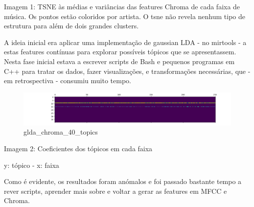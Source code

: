 \documentclass[11pt]{article}
\makeatletter
\def\maxwidth{\ifdim\Gin@nat@width>\linewidth\linewidth
    \else\Gin@nat@width\fi}
\let\Oldincludegraphics\includegraphics
\renewcommand{\includegraphics}[1]{\Oldincludegraphics[width=.8\maxwidth]{#1}}
\makeatother
\begin{document}
Imagem 1: TSNE às médias e variâncias das features Chroma de cada faixa
de música. Os pontos estão coloridos por artista. O tsne não revela
nenhum tipo de estrutura para além de dois grandes clusters.

    A ideia inicial era aplicar uma implementação de gaussian LDA - no
mirtools - a estas features contínuas para explorar possíveis tópicos
que se apresentassem. Nesta fase inicial estava a escrever scripts de
Bash e pequenos programas em C++ para tratar os dados, fazer
visualizações, e transformações necessárias, que - em retrospectiva -
consumiu muito tempo.

    \begin{figure}
\centering
\includegraphics{Resources/phase0/Chroma/gLDA/glda_chroma_40_topics_40_iter.png}
\caption{glda\_chroma\_40\_topics}
\end{figure}

Imagem 2: Coeficientes dos tópicos em cada faixa

y: tópico - x: faixa

    Como é evidente, os resultados foram anómalos e foi passado bastante
tempo a rever scripts, aprender mais sobre e voltar a gerar as features
em MFCC e Chroma.
\end{document}
